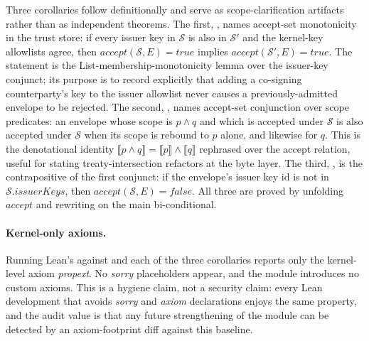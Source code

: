 Three corollaries follow definitionally and serve as scope-clarification artifacts rather than as independent theorems. The first, , names accept-set monotonicity in the trust store: if every issuer key in $\mathcal{S}$ is also in $\mathcal{S}'$ and the kernel-key allowlists agree, then $\mathit{accept}(\mathcal{S},E) = \mathit{true}$ implies $\mathit{accept}(\mathcal{S}',E) = \mathit{true}$. The statement is the List-membership-monotonicity lemma over the issuer-key conjunct; its purpose is to record explicitly that adding a co-signing counterparty's key to the issuer allowlist never causes a previously-admitted envelope to be rejected. The second, , names accept-set conjunction over scope predicates: an envelope whose scope is $p \wedge q$ and which is accepted under $\mathcal{S}$ is also accepted under $\mathcal{S}$ when its scope is rebound to $p$ alone, and likewise for $q$. This is the denotational identity $\llbracket p \wedge q\rrbracket = \llbracket p\rrbracket \wedge \llbracket q\rrbracket$ rephrased over the accept relation, useful for stating treaty-intersection refactors at the byte layer. The third, , is the contrapositive of the first conjunct: if the envelope's issuer key id is not in $\mathcal{S}.\mathit{issuerKeys}$, then $\mathit{accept}(\mathcal{S},E) = \mathit{false}$. All three are proved by unfolding $\mathit{accept}$ and rewriting on the main bi-conditional.

\paragraph{Kernel-only axioms.} Running Lean's  against  and each of the three corollaries reports only the kernel-level axiom \emph{propext}. No \emph{sorry} placeholders appear, and the module introduces no custom axioms. This is a hygiene claim, not a security claim: every Lean development that avoids \emph{sorry} and \emph{axiom} declarations enjoys the same property, and the audit value is that any future strengthening of the module can be detected by an axiom-footprint diff against this baseline.

